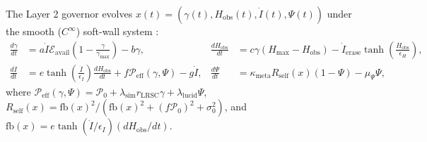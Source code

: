\documentclass[10pt,letterpaper]{article}
\renewcommand{\_}{\textunderscore\allowbreak{}}
\begin{document}
The Layer 2 governor evolves $x(t) = (\gamma(t), H_{\text{obs}}(t), \dot{I}(t), \Psi(t))$ under the smooth ($C^\infty$) soft-wall system \cite{upadhyay2026existence}:
\begin{align}
\frac{d\gamma}{dt} &= a \dot{I} \mathcal{E}_{\text{avail}}\left(1 - \frac{\gamma}{\gamma_{\max}}\right) - b\gamma, &
\frac{dH_{\text{obs}}}{dt} &= c\gamma\left(H_{\max} - H_{\text{obs}}\right) - \dot{I}_{\text{erase}}\tanh\!\left(\frac{H_{\text{obs}}}{\epsilon_H}\right), \label{eq:gh}\\
\frac{d\dot{I}}{dt} &= e\tanh\!\left(\frac{\dot{I}}{\epsilon_I}\right)\frac{dH_{\text{obs}}}{dt} + f\mathcal{P}_{\text{eff}}(\gamma,\Psi) - g\dot{I}, &
\frac{d\Psi}{dt} &= \kappa_{\text{meta}} R_{\text{self}}(x)\left(1 - \Psi\right) - \mu_\Psi \Psi, \label{eq:ipsi}
\end{align}
where $\mathcal{P}_{\text{eff}}(\gamma,\Psi) = \mathcal{P}_0 + \lambda_{\text{sim}} r_{\text{LRSC}}\gamma + \lambda_{\text{lucid}}\Psi$, $R_{\text{self}}(x) = \text{fb}(x)^2 / (\text{fb}(x)^2 + (f\mathcal{P}_0)^2 + \sigma_0^2)$, and $\text{fb}(x) = e\tanh(\dot{I}/\epsilon_I)(dH_{\text{obs}}/dt)$.
\end{document}
